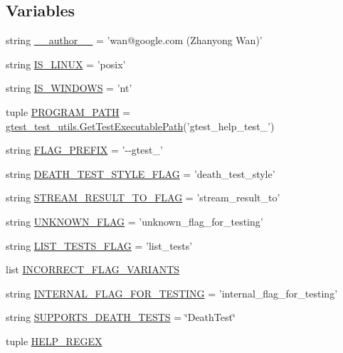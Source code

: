 \subsection*{\-Variables}
\begin{DoxyCompactItemize}
\item 
string \hyperlink{namespacegtest__help__test_a629d61dfe4da763164a4d1a2d85b0afd}{\-\_\-\-\_\-author\-\_\-\-\_\-} = 'wan@google.\-com (\-Zhanyong \-Wan)'
\item 
string \hyperlink{namespacegtest__help__test_a90c275a505433b6e9dc2e404ee55395e}{\-I\-S\-\_\-\-L\-I\-N\-U\-X} = 'posix'
\item 
string \hyperlink{namespacegtest__help__test_ab1b21b880253abfa3ab3dfc19b06814c}{\-I\-S\-\_\-\-W\-I\-N\-D\-O\-W\-S} = 'nt'
\item 
tuple \hyperlink{namespacegtest__help__test_a3b816870dedd295e0dd9adf97b5f39b6}{\-P\-R\-O\-G\-R\-A\-M\-\_\-\-P\-A\-T\-H} = \hyperlink{namespacegtest__test__utils_a1bdf3cac86afa675ed37629b183048e9}{gtest\-\_\-test\-\_\-utils.\-Get\-Test\-Executable\-Path}('gtest\-\_\-help\-\_\-test\-\_\-')
\item 
string \hyperlink{namespacegtest__help__test_a039a9c55dc7e4ad6e844e99fcb46d665}{\-F\-L\-A\-G\-\_\-\-P\-R\-E\-F\-I\-X} = '-\/-\/gtest\-\_\-'
\item 
string \hyperlink{namespacegtest__help__test_a9ffc22a95a6095c01fa05852fcbe4e1a}{\-D\-E\-A\-T\-H\-\_\-\-T\-E\-S\-T\-\_\-\-S\-T\-Y\-L\-E\-\_\-\-F\-L\-A\-G} = 'death\-\_\-test\-\_\-style'
\item 
string \hyperlink{namespacegtest__help__test_a0b9396da51ce1282c41896cc49871bb5}{\-S\-T\-R\-E\-A\-M\-\_\-\-R\-E\-S\-U\-L\-T\-\_\-\-T\-O\-\_\-\-F\-L\-A\-G} = 'stream\-\_\-result\-\_\-to'
\item 
string \hyperlink{namespacegtest__help__test_a1c3a22aa6e1c78f2f91c9de0c07f78c9}{\-U\-N\-K\-N\-O\-W\-N\-\_\-\-F\-L\-A\-G} = 'unknown\-\_\-flag\-\_\-for\-\_\-testing'
\item 
string \hyperlink{namespacegtest__help__test_a6bd797257f4db78c152b6e62341177db}{\-L\-I\-S\-T\-\_\-\-T\-E\-S\-T\-S\-\_\-\-F\-L\-A\-G} = 'list\-\_\-tests'
\item 
list \hyperlink{namespacegtest__help__test_a41c5874bbe0abdd9a254384c06b8b505}{\-I\-N\-C\-O\-R\-R\-E\-C\-T\-\_\-\-F\-L\-A\-G\-\_\-\-V\-A\-R\-I\-A\-N\-T\-S}
\item 
string \hyperlink{namespacegtest__help__test_aa7684642afd3a6cfd9062ebb2c43a10e}{\-I\-N\-T\-E\-R\-N\-A\-L\-\_\-\-F\-L\-A\-G\-\_\-\-F\-O\-R\-\_\-\-T\-E\-S\-T\-I\-N\-G} = 'internal\-\_\-flag\-\_\-for\-\_\-testing'
\item 
string \hyperlink{namespacegtest__help__test_ab164861804ce21115e617dfbe5788ad4}{\-S\-U\-P\-P\-O\-R\-T\-S\-\_\-\-D\-E\-A\-T\-H\-\_\-\-T\-E\-S\-T\-S} = \char`\"{}\-Death\-Test\char`\"{}
\item 
tuple \hyperlink{namespacegtest__help__test_a34b09d4c21c0dcb7e9b3d33ccea634a7}{\-H\-E\-L\-P\-\_\-\-R\-E\-G\-E\-X}
\end{DoxyCompactItemize}


